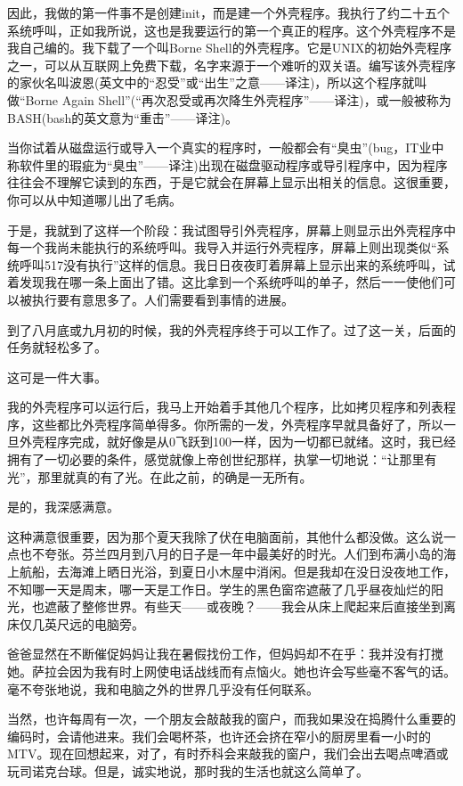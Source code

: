 因此，我做的第一件事不是创建init，而是建一个外壳程序。我执行了约二十五个系统呼叫，正如我所说，这也是我要运行的第一个真正的程序。这个外壳程序不是我自己编的。我下载了一个叫Borne Shell的外壳程序。它是UNIX的初始外壳程序之一，可以从互联网上免费下载，名字来源于一个难听的双关语。编写该外壳程序的家伙名叫波恩(英文中的“忍受”或“出生”之意——译注)，所以这个程序就叫做“Borne Again Shell”(“再次忍受或再次降生外壳程序”——译注)，或一般被称为BASH(bash的英文意为“重击”——译注)。

当你试着从磁盘运行或导入一个真实的程序时，一般都会有“臭虫”(bug，IT业中称软件里的瑕疵为“臭虫”——译注)出现在磁盘驱动程序或导引程序中，因为程序往往会不理解它读到的东西，于是它就会在屏幕上显示出相关的信息。这很重要，你可以从中知道哪儿出了毛病。

于是，我就到了这样一个阶段：我试图导引外壳程序，屏幕上则显示出外壳程序中每一个我尚未能执行的系统呼叫。我导入并运行外壳程序，屏幕上则出现类似“系统呼叫517没有执行”这样的信息。我日日夜夜盯着屏幕上显示出来的系统呼叫，试着发现我在哪一条上面出了错。这比拿到一个系统呼叫的单子，然后一一使他们可以被执行要有意思多了。人们需要看到事情的进展。

到了八月底或九月初的时候，我的外壳程序终于可以工作了。过了这一关，后面的任务就轻松多了。

 

这可是一件大事。

我的外壳程序可以运行后，我马上开始着手其他几个程序，比如拷贝程序和列表程序，这些都比外壳程序简单得多。你所需的一发，外壳程序早就具备好了，所以一旦外壳程序完成，就好像是从0飞跃到100一样，因为一切都已就绪。这时，我已经拥有了一切必要的条件，感觉就像上帝创世纪那样，执掌一切地说：“让那里有光”，那里就真的有了光。在此之前，的确是一无所有。

是的，我深感满意。

这种满意很重要，因为那个夏天我除了伏在电脑面前，其他什么都没做。这么说一点也不夸张。芬兰四月到八月的日子是一年中最美好的时光。人们到布满小岛的海上航船，去海滩上晒日光浴，到夏日小木屋中消闲。但是我却在没日没夜地工作，不知哪一天是周末，哪一天是工作日。学生的黑色窗帘遮蔽了几乎昼夜灿烂的阳光，也遮蔽了整修世界。有些天——或夜晚？——我会从床上爬起来后直接坐到离床仅几英尺远的电脑旁。

爸爸显然在不断催促妈妈让我在暑假找份工作，但妈妈却不在乎：我并没有打搅她。萨拉会因为我有时上网使电话战线而有点恼火。她也许会写些毫不客气的话。毫不夸张地说，我和电脑之外的世界几乎没有任何联系。

当然，也许每周有一次，一个朋友会敲敲我的窗户，而我如果没在捣腾什么重要的编码时，会请他进来。我们会喝杯茶，也许还会挤在窄小的厨房里看一小时的MTV。现在回想起来，对了，有时乔科会来敲我的窗户，我们会出去喝点啤酒或玩司诺克台球。但是，诚实地说，那时我的生活也就这么简单了。

